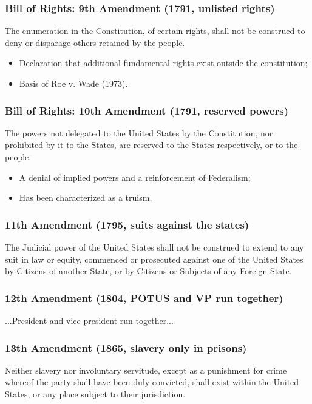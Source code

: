 \documentclass[aspectratio=169]{beamer}
\theoremstyle{principle}
\begin{document}
\begin{frame}
\frametitle{Bill of Rights: 9th Amendment (1791, unlisted rights)}
The enumeration in the Constitution, of certain rights, shall not be construed to deny or disparage others retained by the people.
\bigskip
\begin{itemize}
\item Declaration that additional fundamental rights exist outside the constitution;
\item Basis of Roe v. Wade (1973).
\end{itemize}

\end{frame}

\begin{frame}
\frametitle{Bill of Rights: 10th Amendment (1791, reserved powers)}
The powers not delegated to the United States by the Constitution, nor prohibited by it to the States, are reserved to the States respectively, or to the people.
\bigskip
\begin{itemize}
\item A denial of implied powers and a reinforcement of Federalism;
\item Has been characterized as a truism.
\end{itemize}

\end{frame}

\begin{frame}
\frametitle{11th Amendment (1795, suits against the states)}
The Judicial power of the United States shall not be construed to extend to any suit in law or equity, commenced or prosecuted against one of the United States by Citizens of another State, or by Citizens or Subjects of any Foreign State.

\end{frame}

\begin{frame}
\frametitle{12th Amendment (1804, POTUS and VP run together)}
...President and vice president run together...
\end{frame}

\begin{frame}
\frametitle{13th Amendment (1865, slavery only in prisons)}
Neither slavery nor involuntary servitude, except as a punishment for crime whereof the party shall have been duly convicted, shall exist within the United States, or any place subject to their jurisdiction.
\end{frame}
\end{document}
